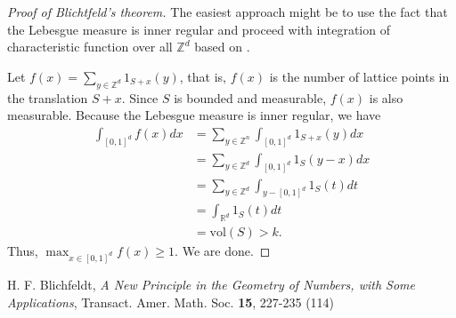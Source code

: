 \documentclass[12pt,reqno]{amsart}
\theoremstyle{definition}
\newcommand{\ZZ}{\mathbb{Z}}
\newcommand{\RR}{\mathbb{R}}
\newcommand{\vol}[1]{\mathrm{vol}(#1)}
\begin{document}
\begin{proof}[Proof of Blichtfeld's theorem]
  The easiest approach might be to use the fact that the Lebesgue measure is inner regular and proceed with integration of characteristic function over all $\ZZ^d$ based on \cite{blich}.


  Let $f(x)=\sum_{y\in \ZZ^d} 1_{S+x}(y)$, that is, $f(x)$ is the number of lattice points in the translation $S+x$. Since $S$ is bounded and measurable, $f(x)$ is also measurable. Because the Lebesgue measure is inner regular, we have
  \begin{align*}
    \int_{[0,1]^d} f(x) dx & =\sum_{y\in\ZZ^n} \int_{[0,1]^d} 1_{S+x}(y)dx  \\
                           & = \sum_{y\in\ZZ^d} \int_{[0,1]^d} 1_{S}(y-x)dx \\
                           & = \sum_{y\in\ZZ^d} \int_{y-[0,1]^d} 1_{S}(t)dt \\
                           & =\int_{\RR^d} 1_{S}(t)dt                       \\
                           & = \vol{S} >k.
  \end{align*}
  Thus, $\max_{x\in [0,1]^d} f(x) \geq 1$. We are done.
\end{proof}

\begin{thebibliography}{9}


  H. F. Blichfeldt, \emph{A New Principle in the Geometry of Numbers, with Some Applications}, Transact. Amer. Math. Soc. \textbf{15}, 227-235 (114)
\end{thebibliography}



\end{document}
